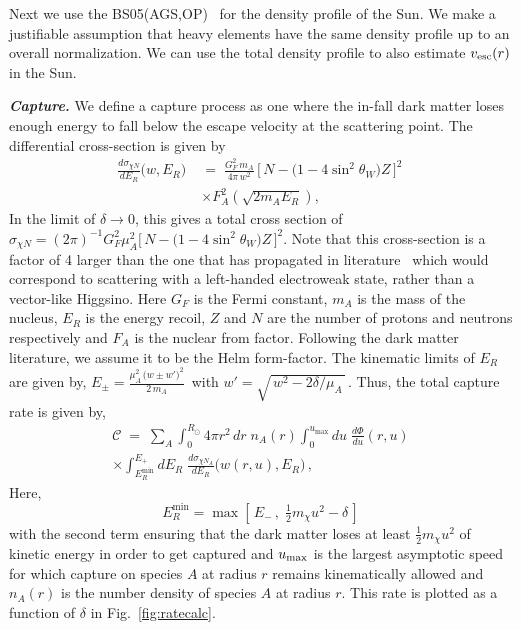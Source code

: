 \documentclass[prl,reprint,superscriptaddress]{revtex4-2}
\begin{document}
Next we use the BS05(AGS,OP)~\cite{Bahcall:2004pz} for the density profile of the Sun. We make a justifiable assumption that heavy elements have the same density profile up to an overall normalization. We can use the total density profile to also estimate $v_{\rm esc}(r)$ in the Sun. 

\textit{\textbf{Capture.}}
We define a capture process as one where the in-fall dark matter loses enough energy to fall below the escape velocity at the scattering point. The differential cross-section is given by~\cite{Essig:2007az,Goodman:1984dc}
\begin{align}
\frac{d\sigma_{\chi N}}{dE_R}\big(w,E_R\big)
   \;&=\; \frac{G_F^{2}\, m_A}{4\pi\, w^{2}}\,
   \Big[\,N - \big(1-4\sin^{2}\theta_W\big)Z\,\Big]^{2}\, \nonumber \\
  &\times  F_A^{2}\!\left(\sqrt{2m_A E_R}\right),
\label{eq:dsdER}
\end{align}
In the limit of $\delta\to 0$, this gives a total cross section of 
$\sigma_{\chi N} = (2 \pi)^{-1}G_F^2 \mu_A^2\Big[\,N - \big(1-4\sin^{2}\theta_W\big)Z\,\Big]^{2}$.
Note that this cross-section is a factor of 4 larger than the one that has propagated in literature~\cite{Cirelli:2005uq,Nagata:2014wma,Bramante:2016rdh,Krall:2017xij,Graham:2024syw} which would correspond to scattering with a left-handed electroweak state, rather than a vector-like Higgsino. 
Here $G_F$ is the Fermi constant, $m_A$ is the mass of the nucleus, $E_R$ is the energy recoil, $Z$ and $N$ are the number of protons and neutrons respectively and $F_A$ is the nuclear from factor. Following the dark matter literature, we assume it to be the Helm form-factor. The kinematic limits of $E_R$ are given by, $E_\pm = \frac{\mu_A^{2}\,\big(w \pm w'\big)^{2}}{2\,m_A}\,$ with
$w' = \sqrt{\,w^{2} - 2\delta/\mu_A\,}\,$. Thus, the total capture rate is given by,
\begin{align}
\mathcal{C} \;=\; \sum_A \int_0^{R_\odot}\! 4\pi r^2\, dr\; n_A(r)
\int_0^{u_{\max}}\! du\;\frac{d\Phi}{du}(r,u) \nonumber \\
\times \int_{E_R^{\min}}^{E_{+}}\! dE_R\;
\frac{d\sigma_{\chi N_A}}{dE_R}\big(w(r,u),E_R\big)\,,
\label{eq:capture}
\end{align}
Here, 
\begin{equation}
E_R^{\min} = \max\!\left[\,E_-\,,\; \tfrac{1}{2} m_\chi u^{2} - \delta\,\right]
\end{equation}
with the second term ensuring that the dark matter loses at least $\tfrac{1}{2} m_\chi u^{2}$ of kinetic energy in order to get captured and $u_{\rm max}$ is the largest asymptotic speed for which capture on species
$A$ at radius $r$ remains kinematically allowed and $n_A(r)$ is the number density of species $A$ at radius $r$.
This rate is plotted as a function of $\delta$ in Fig.~\ref{fig:ratecalc}. 
\end{document}
